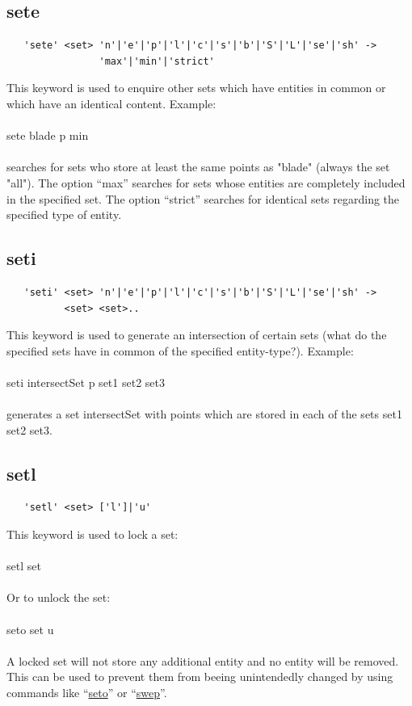 \documentclass{article}
\providecommand{\htmlref}[2]{\hyperref[#2]{#1}}
\begin{document}
\subsection{\label{sete}sete}
\begin{verbatim}
   'sete' <set> 'n'|'e'|'p'|'l'|'c'|'s'|'b'|'S'|'L'|'se'|'sh' ->
                'max'|'min'|'strict'
\end{verbatim}
This keyword is used to enquire other sets which have entities in common or which have an identical content. Example:\\\\sete blade p min\\\\ searches for sets who store at least the same points as "blade" (always the set "all"). The option ``max'' searches for sets whose entities are completely included in the specified set. The option ``strict'' searches for identical sets regarding the specified type of entity.

\subsection{\label{seti}seti}
\begin{verbatim}
   'seti' <set> 'n'|'e'|'p'|'l'|'c'|'s'|'b'|'S'|'L'|'se'|'sh' ->
          <set> <set>.. 
\end{verbatim}
This keyword is used to generate an intersection of certain sets (what do the specified sets have in common of the specified entity-type?). Example:\\\\seti intersectSet p set1 set2 set3\\\\generates a set intersectSet with points which are stored in each of the sets set1 set2 set3.

\subsection{\label{setl}setl}
\begin{verbatim}
   'setl' <set> ['l']|'u' 
\end{verbatim}
This keyword is used to lock a set:\\\\
setl set\\\\
Or to unlock the set:\\\\
seto set u\\\\
A locked set will not store any additional entity and no entity will be removed. This can be used to prevent them from beeing unintendedly changed by using commands like ``\htmlref{seto}{seto}'' or ``\htmlref{swep}{swep}''.
\end{document}
